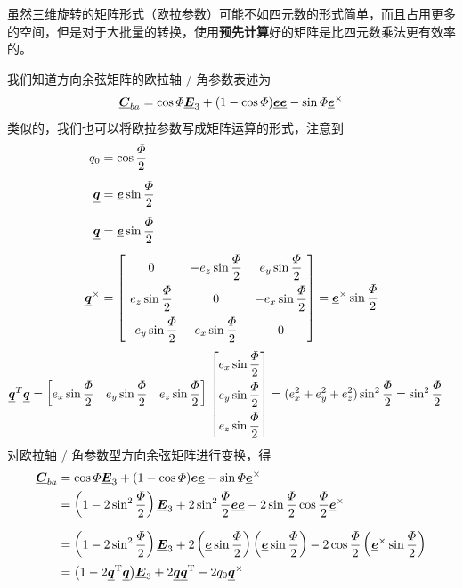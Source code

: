 虽然三维旋转的矩阵形式（欧拉参数）可能不如四元数的形式简单，而且占用更多的空间，但是对于大批量的转换，使用\textbf{预先计算}好的矩阵是比四元数乘法更有效率的。


我们知道方向余弦矩阵的欧拉轴 / 角参数表述为
\begin{equation}
	\underline{\bm{C}}_{ba} = \cos \varPhi \underline{\bm{E}}_3 +(1 - \cos \varPhi)\underline{\bm{e}}\underline{\bm{e}} - \sin \varPhi \underline{\bm{e}}^\times
\end{equation}
类似的，我们也可以将欧拉参数写成矩阵运算的形式，注意到
\begin{align*}
	q_0 &= \cos \dfrac{\varPhi}{2}\\[0.5em]
	\underline{\bm{q}} &= \underline{\bm{e}} \sin \dfrac{\varPhi}{2} \\[0.5em]
	\underline{\bm{q}} &= \underline{\bm{e}} \sin \dfrac{\varPhi}{2} \\[0.5em]
	\underline{\bm{q}}^{\times} &= 
	\begin{bmatrix}
		0 & -e_z\sin \dfrac{\varPhi}{2} & e_y\sin \dfrac{\varPhi}{2} \\[0.8em]
		e_z\sin \dfrac{\varPhi}{2} & 0 & -e_x\sin \dfrac{\varPhi}{2} \\[0.8em]
		-e_y\sin \dfrac{\varPhi}{2} & e_x\sin \dfrac{\varPhi}{2} & 0
	\end{bmatrix}
	= \underline{\bm{e}}^\times \sin \dfrac{\varPhi}{2}
\end{align*}
\begin{align*}
	\underline{\bm{q}}^T \underline{\bm{q}} &= 
	\bigg[ e_x \sin \dfrac{\varPhi}{2} \quad e_y \sin \dfrac{\varPhi}{2} \quad e_z \sin  \dfrac{\varPhi}{2} \bigg]
	\,
	\begin{bmatrix}
		e_x \sin \dfrac{\varPhi}{2} \\[0.8em]
		 e_y \sin \dfrac{\varPhi}{2} \\[0.8em]
		 e_z \sin  \dfrac{\varPhi}{2}
	\end{bmatrix}
	= (e_x^2 +e_y^2 + e_z^2)\sin^2 \dfrac{\varPhi}{2} = \sin^2 \dfrac{\varPhi}{2}
\end{align*}
对欧拉轴 / 角参数型方向余弦矩阵进行变换，得
\begin{align}
	\underline{\bm{C}}_{ba} &= \cos \varPhi \underline{\bm{E}}_3 + (1 - \cos \varPhi)\bm{e}\underline{\bm{e}} - \sin \varPhi \underline{\bm{e}}^\times \notag \\
	&= \left( 1 - 2\sin^2 \dfrac{\varPhi}{2} \right) \underline{\bm{E}}_3 + 2 \sin^2 \dfrac{\varPhi}{2} \underline{\bm{e}}\underline{\bm{e}} - 2 \sin \dfrac{\varPhi}{2} \cos \dfrac{\varPhi}{2} \underline{\bm{e}}^\times \notag \\[0.5em]
	&= \left( 1 - 2\sin^2 \dfrac{\varPhi}{2}\right) \underline{\bm{E}}_3 + 2\left( \underline{\bm{e}} \sin \dfrac{\varPhi}{2}\right)\left( \underline{\bm{e}} \sin \dfrac{\varPhi}{2}\right) - 2 \cos \dfrac{\varPhi}{2} \left( \underline{\bm{e}}^\times \sin \dfrac{\varPhi}{2} \right) \notag \\
	& = \big( 1 - 2\underline{\bm{q}}^{\text{T}} \underline{\bm{q}} \big) \underline{\bm{E}}_3 + 2 \underline{\bm{q}}\underline{\bm{q}}^{\text{T}} - 2 q_0 \underline{\bm{q}}^\times 
\end{align}


